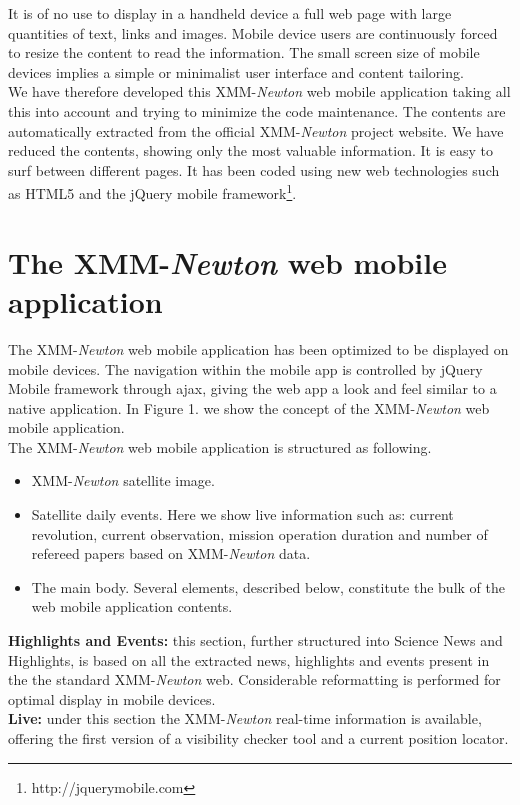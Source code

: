 \documentclass[11pt,twoside]{article}
\newcommand{\xmm}{{XMM-{\em Newton} }}
\begin{document}
It is of no use to display in a handheld device a full web page with
large quantities of text, links and images. Mobile device users are
continuously forced to resize the content to read the information. The
small screen size of mobile devices implies a simple or minimalist user
interface and content tailoring.\\

We have therefore developed this \xmm web mobile application taking
all this into account and trying to minimize the code maintenance. The
contents are automatically extracted from the official \xmm project
website. We have reduced the contents, showing only the most valuable
information. It is easy to surf between different pages. It has been
coded using new web technologies such as HTML5 and the jQuery mobile
framework\footnote{http://jquerymobile.com}.

\section{The \xmm web mobile application}

The \xmm web mobile application has been optimized to be displayed on
mobile devices. The navigation within the mobile app is controlled by
jQuery Mobile framework through ajax, giving the web app a look and
feel similar to a native application. In Figure 1. we show the concept
of the \xmm web mobile application.\\

The \xmm web mobile application is structured as following.
\begin{itemize}
\item \xmm satellite image.
\item Satellite daily events. Here we show live information such as: current revolution, 
current observation, mission operation duration and number of refereed papers based on 
\xmm data.
\item The main body. Several elements, described below, constitute the 
bulk of the web mobile application contents.
\end{itemize}

{\bf Highlights and Events:} this section, further structured into
Science News and Highlights, is based on all the extracted news,
highlights and events present in the the standard \xmm
web. Considerable reformatting is performed for optimal display in
mobile devices.\\

{\bf Live:} under this section the \xmm real-time information is available,
offering the first version of a visibility checker tool and a current
position locator.\\ 
\end{document}

